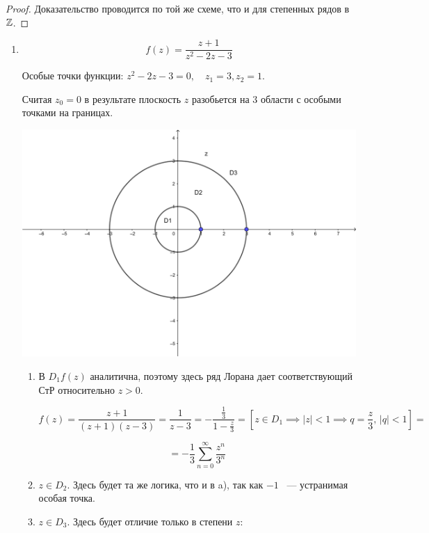 \documentclass[../../main.tex]{subfiles}
\begin{document}
\begin{proof}
	Доказательство проводится по той же схеме, что и для степенных рядов в $\mathbb{Z}$.
\end{proof}

\begin{exmp}
	\begin{enumerate}
		\item \[ f(z) = \frac{z + 1}{z^2 - 2z - 3} \]
		
		Особые точки функции: $ z^2 - 2z - 3 = 0, \quad z_1 = 3, z_2 = 1 $.
		
		Считая $ z_0 = 0 $ в результате плоскость $z$ разобьется на 3 области с особыми точками на границах.
		
		\begin{center}
			\includegraphics[scale = 0.65]{lec34_1} 
		\end{center}
		
		\begin{enumerate}
			\item В $ D_1 f(z) $ аналитична, поэтому здесь ряд Лорана дает соответствующий СтР относительно $ z > 0 $.
			
			\[ f(z) = \frac{z + 1}{(z + 1)(z - 3)} = \frac{1}{z - 3} = -\frac{\frac{1}{3}}{1 - \frac{z}{3}} = \left[ z \in D_1 \implies |z| < 1 \implies q = \frac{z}{3},\, |q| < 1 \right] = \]
			
			\[ = -\frac{1}{3} \sum\limits_{n = 0}^{\infty} \frac{z^n}{3^n} \]
			
			\item $ z \in D_2 $. Здесь будет та же логика, что и в a), так как $ -1 $ ~--- устранимая особая точка.
			
			\item $ z \in D_3 $. Здесь будет отличие только в степени $z$:
			

\end{enumerate}
\end{enumerate}
\end{exmp}
\end{document}
